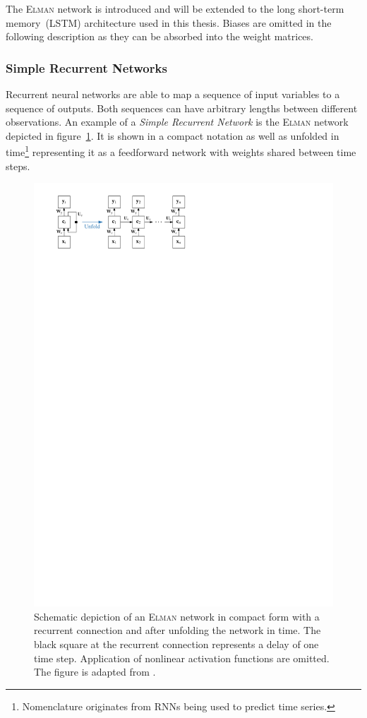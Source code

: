 The \textsc{Elman} network is introduced and will be extended to the long
short-term memory~(LSTM) architecture used in this thesis. Biases are omitted in
the following description as they can be absorbed into the weight matrices.

\subsubsection{Simple Recurrent Networks}
\label{sec:simple_recurrent_networks}
Recurrent neural networks are able to map a sequence of input variables to a
sequence of outputs. Both sequences can have arbitrary lengths between different
observations. An example of a \emph{Simple Recurrent Network} is the
\textsc{Elman} network depicted in figure~\ref{fig:schematic_elman_rnn}. It is
shown in a compact notation as well as unfolded in time\footnote{Nomenclature
  originates from RNNs being used to predict time series.} representing it as a
feedforward network with weights shared between time steps.
\begin{figure}[htb]
  \centering
  \includegraphics{./figures/theory/elman_rnn.pdf}
  \caption{Schematic depiction of an \textsc{Elman} network in compact form with
    a recurrent connection and after unfolding the network in time. The black
    square at the recurrent connection represents a delay of one time step.
    Application of nonlinear activation functions are omitted. The figure is
    adapted from \cite{lecun_bengio_hinton_DL}.}
  \label{fig:schematic_elman_rnn}
\end{figure}
